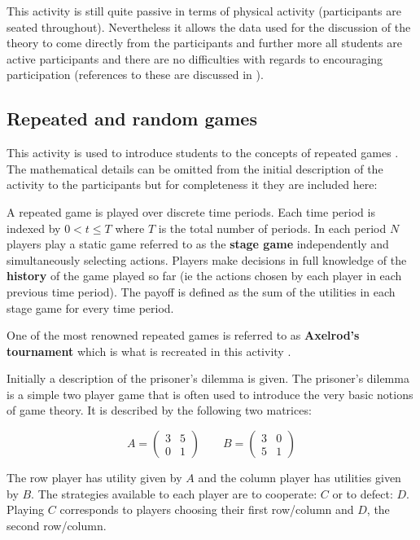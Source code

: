 \documentclass{article}
\begin{document}
This activity is still quite passive in terms of physical activity (participants are
seated throughout). Nevertheless it allows the data used for the discussion of
the theory to come directly from the participants and further more all students
are active participants and there are no difficulties with regards to
encouraging participation (references to these are discussed in \cite{Rocca2010}).

\subsection{Repeated and random games}\label{sec:repeated_games}

This activity is used to introduce students to the concepts of repeated games
\cite{Maschler2013}. The mathematical details can be omitted from the initial
description of the activity to the participants but for completeness it they are
included here:

A repeated game is played over discrete time periods. Each time period is
indexed by \(0<t\leq T\) where \(T\) is the total number of periods.  In each
period \(N\) players play a static game referred to as the \textbf{stage game}
independently and simultaneously selecting actions.  Players make decisions in
full knowledge of the \textbf{history} of the game played so far (ie the actions
chosen by each player in each previous time period).  The payoff is defined
as the sum of the utilities in each stage game for every time period.

One of the most renowned repeated games is referred to as \textbf{Axelrod's
tournament} which is what is recreated in this activity \cite{Axelrod1980a,
Axelrod1980b}.

Initially a description of the prisoner's dilemma \cite{Maschler2013} is given.
The prisoner's dilemma is a simple two player game that is often used to
introduce the very basic notions of game theory. It is described by the
following two matrices:

\[
    A =
    \begin{pmatrix}
        3&5\\
        0&1
    \end{pmatrix}
    \qquad
    B =
    \begin{pmatrix}
        3&0\\
        5&1
    \end{pmatrix}
\]

The row player has utility given by \(A\) and the column player has utilities
given by \(B\).
The strategies available to each player are to cooperate: \(C\) or to defect:
\(D\). Playing \(C\) corresponds to players choosing their first row/column and
\(D\), the second row/column.
\end{document}
